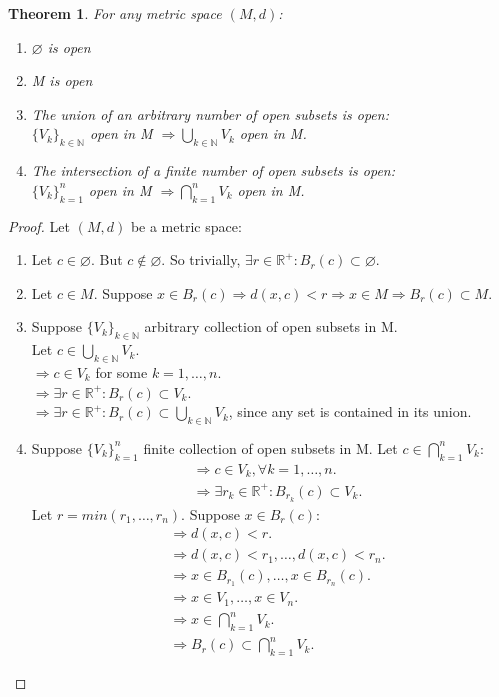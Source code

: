\documentclass{article}
\newtheorem{theorem}{Theorem}[section]
\begin{document}
			\begin{theorem}
				For any metric space $(M, d)$:
				\begin{enumerate}
					\item $\varnothing$ is open
					\item M is open
					\item The union of an arbitrary number of open subsets is open: \\
					$\{V_{k}\}_{k \in \mathbb{N}}$ open in M $\Rightarrow \bigcup_{k \in \mathbb{N}} V_{k}$ open in M. 
					\item The intersection of a finite number of open subsets is open: \\
					$\{V_{k}\}_{k=1}^{n}$ open in M $\Rightarrow \bigcap_{k=1}^{n} V_{k}$ open in M.
				\end{enumerate}
			\end{theorem}
			\begin{proof} 
				Let $(M, d)$ be a metric space:
				\begin{enumerate}
					\item Let $c \in \varnothing$. But $c \notin \varnothing$. So trivially, $\exists r \in \mathbb{R^{+}}: B_{r}(c) \subset \varnothing$.
					\item Let $c \in M$. Suppose $x \in B_{r}(c) \Rightarrow d(x, c) < r \Rightarrow x \in M \Rightarrow B_{r}(c) \subset M$.
					\item Suppose $\{V_{k}\}_{k \in \mathbb{N}}$ arbitrary collection of open subsets in M. \\
						Let $c \in \bigcup_{k \in \mathbb{N}} V_{k}$. \\
						$\Rightarrow c \in V_{k}$ for some $k = 1, \ldots, n$. \\
						$\Rightarrow \exists r \in \mathbb{R^{+}}: B_{r}(c) \subset V_{k}$. \\
						$\Rightarrow \exists r \in \mathbb{R^{+}}: B_{r}(c) \subset \bigcup_{k \in \mathbb{N}} V_{k}$, since any set is contained in its union.
					\item Suppose $\{V_{k}\}_{k=1}^{n}$ finite collection of open subsets in M. Let $c \in \bigcap_{k=1}^{n} V_{k}$:
					\begin{align*}
						&\Rightarrow c \in V_{k}, \forall k = 1, \ldots, n. \\
						&\Rightarrow \exists r_{k} \in \mathbb{R^{+}}: B_{r_{k}}(c) \subset V_{k}.
					\end{align*}
					Let $r = min(r_{1}, \ldots, r_{n})$. Suppose $x \in B_{r}(c)$:
					\begin{align*}
						&\Rightarrow d(x, c) < r. \\
						&\Rightarrow d(x, c) < r_{1}, \ldots, d(x, c) < r_{n}. \\
						&\Rightarrow x \in B_{r_{1}}(c), \ldots, x \in B_{r_{n}}(c). \\
						&\Rightarrow x \in V_{1}, \ldots, x \in V_{n}. \\
						&\Rightarrow x \in \bigcap_{k=1}^{n} V_{k}. \\
						&\Rightarrow B_{r}(c) \subset \bigcap_{k=1}^{n} V_{k}.
					\end{align*}					
				\end{enumerate}
			\end{proof}
\end{document}
